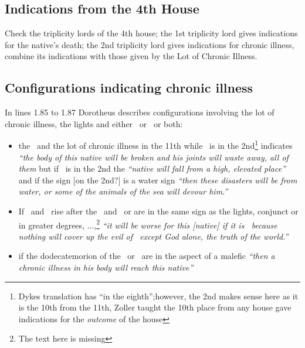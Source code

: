\subsection{Indications from the 4th House}
Check  the triplicity lords of the 4th house; the 1st triplicity lord gives indications for the native's death; the 2nd triplicity lord gives indications for chronic illness, combine its indications with those given by the Lot of Chronic Illness.

\subsection{Configurations indicating chronic illness}
In lines 1.85 to 1.87 Dorotheus describes configurations involving the lot of chronic illness, the lights and either \Mars\, or \Saturn\, or both:
\begin{itemize}[topsep=0em,itemsep=0em]
\item the \Moon\, and the lot of chronic illness in the 11th while \Mars\, is in the 2nd\footnote{Dykes translation has ``in the eighth'';however, the 2nd makes sense here as it is the 10th from the 11th, Zoller taught the 10th place from any house gave indications for the \textsl{outcome} of the house} indicates \textsl{``the body of this native will be broken and his joints will waste away, all of them} but if \Saturn\, is in the 2nd the \textsl{``native will fall from a high, elevated place''} and if the sign [on the 2nd?] is a water sign \textsl{``then these disasters will be from water, or some of the animals of the sea will devour him.''}

\item If \Mars\, and \Saturn\, rise after the \Sun\, and \Moon\, or are in the same sign as the lights, conjunct or in greater degrees, ...,\footnote{The text here is missing} \textsl{``it will be worse for this [native] if it is \Mars\, because nothing will cover up the evil of \Mars\, except God alone, the truth of the world.''}

\item if  the dodecatemorion of the \Sun\, or \Moon\, are in the aspect of a malefic \textsl{``then a chronic illness in his body will reach this native''}
\end{itemize}

